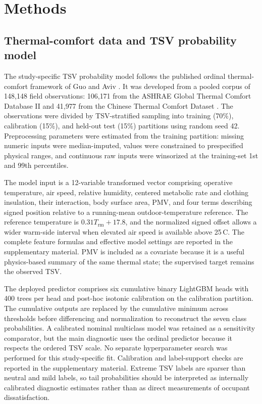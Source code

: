 \section{Methods}\label{method}

\subsection{Thermal-comfort data and TSV probability model}

The study-specific TSV probability model follows the published ordinal thermal-comfort framework of Guo and Aviv \citep{guo2026seven}. It was developed from a pooled corpus of 148{,}148 field observations: 106{,}171 from the ASHRAE Global Thermal Comfort Database II \citep{Foldvary2018GlobalDB} and 41{,}977 from the Chinese Thermal Comfort Dataset \citep{Yang2023ChineseDataset,Chang2025Review}. The observations were divided by TSV-stratified sampling into training (70\%), calibration (15\%), and held-out test (15\%) partitions using random seed 42. Preprocessing parameters were estimated from the training partition: missing numeric inputs were median-imputed, values were constrained to prespecified physical ranges, and continuous raw inputs were winsorized at the training-set 1st and 99th percentiles.

The model input is a 12-variable transformed vector comprising operative temperature, air speed, relative humidity, centered metabolic rate and clothing insulation, their interaction, body surface area, PMV, and four terms describing signed position relative to a running-mean outdoor-temperature reference. The reference temperature is $0.31T_{\mathrm{rm}}+17.8$, and the normalized signed offset allows a wider warm-side interval when elevated air speed is available above 25\,\degree C. The complete feature formulas and effective model settings are reported in the supplementary material. PMV is included as a covariate because it is a useful physics-based summary of the same thermal state; the supervised target remains the observed TSV.

The deployed predictor comprises six cumulative binary LightGBM heads with 400 trees per head and post-hoc isotonic calibration on the calibration partition. The cumulative outputs are replaced by the cumulative minimum across thresholds before differencing and normalization to reconstruct the seven class probabilities. A calibrated nominal multiclass model was retained as a sensitivity comparator, but the main diagnostic uses the ordinal predictor because it respects the ordered TSV scale. No separate hyperparameter search was performed for this study-specific fit. Calibration and label-support checks are reported in the supplementary material. Extreme TSV labels are sparser than neutral and mild labels, so tail probabilities should be interpreted as internally calibrated diagnostic estimates rather than as direct measurements of occupant dissatisfaction.

